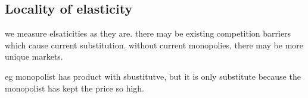 
\subsection{Locality of elasticity}

we measure elsaticities as they are. there may be existing competition barriers which cause current substitution. without current monopolies, there may be more unique markets.

eg monopolist has product with sbustitutve, but it is only substitute because the monopolist has kept the price so high.

